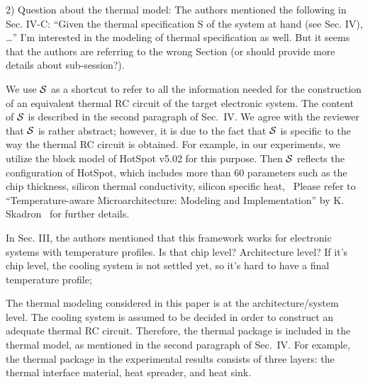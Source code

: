\begin{reviewer}
2) Question about the thermal model: The authors mentioned the following in Sec. IV-C: ``Given the thermal specification S of the system at hand (see Sec. IV), \ldots'' I’m interested in the modeling of thermal specification as well. But it seems that the authors are referring to the wrong Section (or should provide more details about sub-session?).
\end{reviewer}
\begin{authors}
We use $\mathcal{S}$ as a shortcut to refer to all the information needed for the construction of an equivalent thermal RC circuit of the target electronic system.
The content of $\mathcal{S}$ is described in the second paragraph of Sec.~IV.
We agree with the reviewer that $\mathcal{S}$ is rather abstract; however, it is due to the fact that $\mathcal{S}$ is specific to the way the thermal RC circuit is obtained.
For example, in our experiments, we utilize the block model of HotSpot v5.02 for this purpose.
Then $\mathcal{S}$ reflects the configuration of HotSpot, which includes more than 60 parameters such as the chip thickness, silicon thermal conductivity, silicon specific heat, \etc\ Please refer to ``Temperature-aware Microarchitecture: Modeling and Implementation'' by K. Skadron \etal\ for further details.

\begin{actions}
\end{actions}
\end{authors}

\begin{reviewer}
In Sec. III, the authors mentioned that this framework works for electronic systems with temperature profiles. Is that chip level? Architecture level? If it’s chip level, the cooling system is not settled yet, so it’s hard to have a final temperature profile;
\end{reviewer}
\begin{authors}
The thermal modeling considered in this paper is at the architecture/system level.
The cooling system is assumed to be decided in order to construct an adequate thermal RC circuit.
Therefore, the thermal package is included in the thermal model, as mentioned in the second paragraph of Sec.~IV.
For example, the thermal package in the experimental results consists of three layers: the thermal interface material, heat spreader, and heat sink.

\begin{actions}
\end{actions}
\end{authors}

